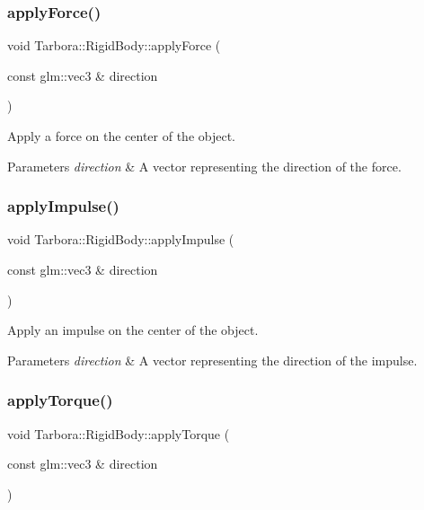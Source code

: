 \subsubsection{\texorpdfstring{apply\+Force()}{applyForce()}}
{\footnotesize\ttfamily void Tarbora\+::\+Rigid\+Body\+::apply\+Force (\begin{DoxyParamCaption}\item[{const glm\+::vec3 \&}]{direction }\end{DoxyParamCaption})}



Apply a force on the center of the object. 


\begin{DoxyParams}{Parameters}
{\em direction} & A vector representing the direction of the force. \\
\hline
\end{DoxyParams}
\mbox{\label{classTarbora_1_1RigidBody_a814a768747705b5a0c8fc81fca1ab1bc}} 
\subsubsection{\texorpdfstring{apply\+Impulse()}{applyImpulse()}}
{\footnotesize\ttfamily void Tarbora\+::\+Rigid\+Body\+::apply\+Impulse (\begin{DoxyParamCaption}\item[{const glm\+::vec3 \&}]{direction }\end{DoxyParamCaption})}



Apply an impulse on the center of the object. 


\begin{DoxyParams}{Parameters}
{\em direction} & A vector representing the direction of the impulse. \\
\hline
\end{DoxyParams}
\mbox{\label{classTarbora_1_1RigidBody_ab1f757870850021535f28674bce9eb20}} 
\subsubsection{\texorpdfstring{apply\+Torque()}{applyTorque()}}
{\footnotesize\ttfamily void Tarbora\+::\+Rigid\+Body\+::apply\+Torque (\begin{DoxyParamCaption}\item[{const glm\+::vec3 \&}]{direction }\end{DoxyParamCaption})}



